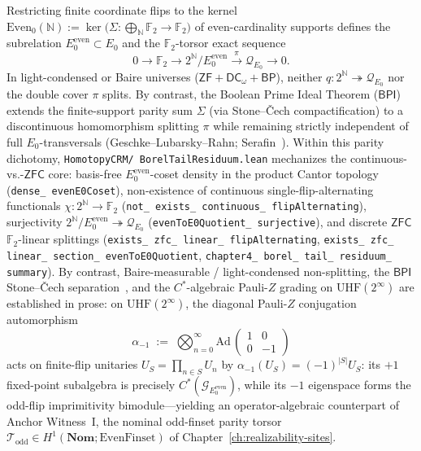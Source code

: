 \begin{remark}\label{rem:pauli-z-parity}%
%
%
Restricting finite coordinate flips to the kernel $\mathrm{Even}_0(\mathbb{N}) := \ker\bigl(\Sigma : \bigoplus_{\mathbb{N}} \mathbb{F}_2 \to \mathbb{F}_2\bigr)$ of even-cardinality supports defines the subrelation $E_0^{\mathrm{even}} \subset E_0$ and the $\mathbb{F}_2$-torsor exact sequence
\[
  0 \longrightarrow \mathbb{F}_2 \longrightarrow 2^{\mathbb{N}}/E_0^{\mathrm{even}} \xrightarrow{\;\pi\;} \mathcal{Q}_{E_0} \longrightarrow 0.
\]
In light-condensed or Baire universes ($\mathsf{ZF}+\mathsf{DC}_\omega+\mathsf{BP}$), neither $q : 2^{\mathbb{N}} \twoheadrightarrow \mathcal{Q}_{E_0}$ nor the double cover $\pi$ splits. By contrast, the Boolean Prime Ideal Theorem ($\mathsf{BPI}$) extends the finite-support parity sum $\Sigma$ (via Stone--\v{C}ech compactification) to a discontinuous homomorphism splitting $\pi$ while remaining strictly independent of full $E_0$-transversals (Geschke--Lubarsky--Rahn; Serafin~\cite{Serafin23}). Within this parity dichotomy, \texttt{HomotopyCRM/ BorelTailResiduum.lean} mechanizes the continuous-vs.-$\mathsf{ZFC}$ core: basis-free $E_0^{\mathrm{even}}$-coset density in the product Cantor topology (\texttt{dense\_ evenE0Coset}), non-existence of continuous single-flip-alternating functionals $\chi : 2^{\mathbb{N}} \to \mathbb{F}_2$ (\texttt{not\_ exists\_ continuous\_ flipAlternating}), surjectivity $2^{\mathbb{N}}/E_0^{\mathrm{even}} \twoheadrightarrow \mathcal{Q}_{E_0}$ (\texttt{evenToE0Quotient\_ surjective}), and discrete $\mathsf{ZFC}$ $\mathbb{F}_2$-linear splittings (\texttt{exists\_ zfc\_ linear\_ flipAlternating}, \texttt{exists\_ zfc\_ linear\_ section\_ evenToE0Quotient}, \texttt{chapter4\_ borel\_ tail\_ residuum\_ summary}). By contrast, Baire-measurable / light-condensed non-splitting, the $\mathsf{BPI}$ Stone--\v{C}ech separation~\cite{Serafin23}, and the $C^*$-algebraic Pauli-$Z$ grading on $\mathrm{UHF}(2^\infty)$ are established in prose: on $\mathrm{UHF}(2^\infty)$, the diagonal Pauli-$Z$ conjugation automorphism
\[
  \alpha_{-1} \;:=\; \bigotimes_{n=0}^{\infty} \mathrm{Ad}\,\begin{pmatrix} 1 & 0 \\ 0 & -1 \end{pmatrix}
\]
acts on finite-flip unitaries $U_S = \prod_{n \in S} U_n$ by $\alpha_{-1}(U_S) = (-1)^{|S|} U_S$: its $+1$ fixed-point subalgebra is precisely $C^*(\mathcal{G}_{E_0^{\mathrm{even}}})$, while its $-1$ eigenspace forms the odd-flip imprimitivity bimodule---yielding an operator-algebraic counterpart of Anchor Witness~I, the nominal odd-finset parity torsor $\mathcal{T}_{\mathrm{odd}} \in H^1(\mathbf{Nom}; \mathrm{EvenFinset})$ of Chapter~\ref{ch:realizability-sites}.
\end{remark}

